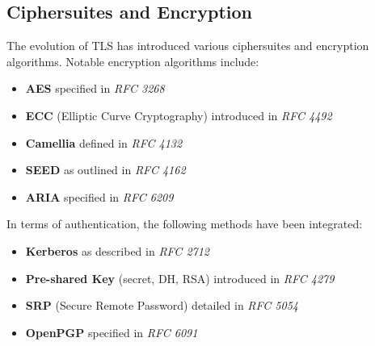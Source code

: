 \subsection{Ciphersuites and Encryption} The evolution of TLS has introduced various ciphersuites and encryption algorithms. Notable encryption algorithms include:
\begin{itemize}[itemsep=0pt]  
    \item \textbf{AES} specified in \textit{RFC 3268} 
    \item \textbf{ECC} (Elliptic Curve Cryptography) introduced in \textit{RFC 4492} 
    \item \textbf{Camellia} defined in \textit{RFC 4132} 
    \item \textbf{SEED} as outlined in \textit{RFC 4162} \item \textbf{ARIA} specified in \textit{RFC 6209} \end{itemize} In terms of authentication, the following methods have been integrated: \begin{itemize}[itemsep=0pt]  
        \item \textbf{Kerberos} as described in \textit{RFC 2712} 
        \item \textbf{Pre-shared Key} (secret, DH, RSA) introduced in \textit{RFC 4279} 
        \item \textbf{SRP} (Secure Remote Password) detailed in \textit{RFC 5054} 
        \item \textbf{OpenPGP} specified in \textit{RFC 6091} 
    \end{itemize}

